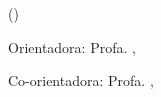 \thispagestyle{empty}
\makeatletter
\begin{spacing}{1}
\begin{center}

\large \MakeUppercase{\@faculdade}

\large \MakeUppercase{\@instcomp}

\large \MakeUppercase{\@instnce}

\large \MakeUppercase{\@programa} (\@progsigla)

\vspace{2cm}
\large \MakeUppercase{\@author}

\vspace{2cm}
\large \textbf{\MakeUppercase{\@title}}
\end{center}

\vspace{0.5cm}
\begin{quoting}[leftmargin=7.5cm, rightmargin=1cm]
\@textofolharosto
\end{quoting}

\vspace{2cm}
Orientadora: Profa. \@orientadora, \@orientadorastitulo

Co-orientadora: Profa. \@coorientadora, \@orientadorastitulo

\vspace*{\fill}
\begin{center}
\@cidade\\
\@date
\end{center}

\end{spacing}
\makeatother
\newpage